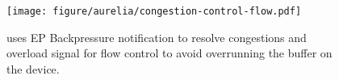 
%

\begin{figure}[ht!]
    \centering
    \texttt{[image: figure/aurelia/congestion-control-flow.pdf]}
    \caption{\aurelia uses EP Backpressure notification to resolve congestions and overload signal for flow control to avoid overrunning the buffer on the device.}
    \label{fig:congestion-control}
\end{figure}

